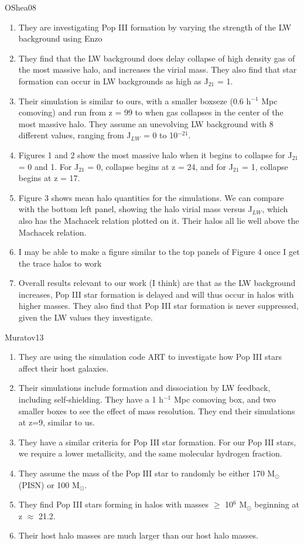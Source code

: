 \documentclass[a4paper,fleqn,usenatbib]{mnras}
\begin{document}
\li OShea08
\begin{enumerate}
	\item They are investigating Pop III formation by varying the strength of the LW background using Enzo
	\item They find that the LW background does delay collapse of high density gas of the most massive halo, and increases the virial mass. They also find that star formation can occur in LW backgrounds as high as J$_{21}$ = 1. 
	\item Their simulation is similar to ours, with a smaller boxseze (0.6 h$^{-1}$ Mpc comoving) and run from z = 99 to when gas collapses in the center of the most massive halo. They assume an unevolving LW background with 8 different values, ranging from J$_{LW}$ = 0 to 10$^{-21}$. 
	\item Figures 1 and 2 show the most massive halo when it begins to collapse for J$_{21}$ = 0 and 1. For J$_{21}$ = 0, collapse begins at z = 24, and for J$_{21}$ = 1, collapse begins at z = 17. 
	\item Figure 3 shows mean halo quantities for the simulations. We can compare with the bottom left panel, showing the halo virial mass versus J$_{LW}$, which also has the Machacek relation plotted on it. Their halos all lie well above the Machacek relation.
	\item I may be able to make a figure similar to the top panels of Figure 4 once I get the trace halos to work
	\item Overall results relevant to our work (I think) are that as the LW background increases, Pop III star formation is delayed and will thus occur in halos with higher masses. They also find that Pop III star formation is never suppressed, given the LW values they investigate.
\end{enumerate}

\li Muratov13
\begin{enumerate}
	\item They are using the simulation code ART to investigate how Pop III stars affect their host galaxies. 
	\item Their simulations include \hh{} formation and dissociation by LW feedback, including self-shielding. They have a 1 h$^{-1}$ Mpc comoving box, and two smaller boxes to see the effect of mass resolution. They end their simulations at z=9, similar to us.
	\item They have a similar criteria for Pop III star formation. For our Pop III stars, we require a lower metallicity, and the same molecular hydrogen fraction. 
	\item They assume the mass of the Pop III star to randomly be either 170 M$_{\odot}$ (PISN) or 100 M$_{\odot}$. 
	\item They find Pop III stars forming in halos with masses $\geq$ 10$^{6}$ M$_{\odot}$ beginning at z $\approx$ 21.2. 
	\item Their host halo masses are much larger than our host halo masses. 
\end{enumerate}
\end{document}
